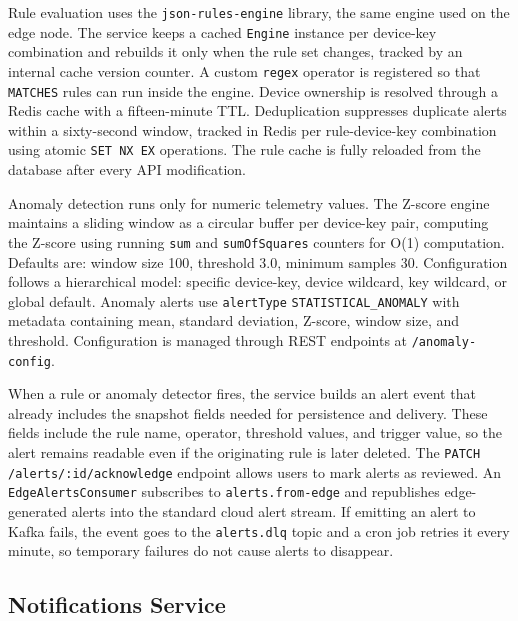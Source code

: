 Rule evaluation uses the \texttt{json-rules-engine} library, the same engine used on the edge node. The service keeps a cached \texttt{Engine} instance per device-key combination and rebuilds it only when the rule set changes, tracked by an internal cache version counter. A custom \texttt{regex} operator is registered so that \texttt{MATCHES} rules can run inside the engine. Device ownership is resolved through a Redis cache with a fifteen-minute TTL. Deduplication suppresses duplicate alerts within a sixty-second window, tracked in Redis per rule-device-key combination using atomic \texttt{SET NX EX} operations. The rule cache is fully reloaded from the database after every \gls{API} modification.

Anomaly detection runs only for numeric telemetry values. The Z-score engine maintains a sliding window as a circular buffer per device-key pair, computing the Z-score using running \texttt{sum} and \texttt{sumOfSquares} counters for O(1) computation. Defaults are: window size 100, threshold 3.0, minimum samples 30. Configuration follows a hierarchical model: specific device-key, device wildcard, key wildcard, or global default. Anomaly alerts use \texttt{alertType} \texttt{STATISTICAL\_ANOMALY} with metadata containing mean, standard deviation, Z-score, window size, and threshold. Configuration is managed through \gls{REST} endpoints at \texttt{/anomaly-config}.

When a rule or anomaly detector fires, the service builds an alert event that already includes the snapshot fields needed for persistence and delivery. These fields include the rule name, operator, threshold values, and trigger value, so the alert remains readable even if the originating rule is later deleted. The \texttt{PATCH /alerts/:id/acknowledge} endpoint allows users to mark alerts as reviewed. An \texttt{EdgeAlertsConsumer} subscribes to \texttt{alerts.from-edge} and republishes edge-generated alerts into the standard cloud alert stream. If emitting an alert to Kafka fails, the event goes to the \texttt{alerts.dlq} topic and a cron job retries it every minute, so temporary failures do not cause alerts to disappear.

\subsection{Notifications Service}
\label{subsec:NotificationsServiceImpl}

